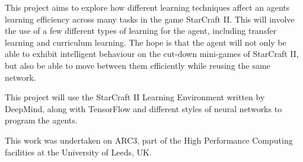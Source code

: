 This project aims to explore how different learning techniques affect an agents
learning efficiency across many tasks in the game StarCraft II\@.
This will involve the use of a few different types of learning for the agent,
including transfer learning and curriculum learning. The hope is that the
agent will not only be able to exhibit intelligent behaviour on the cut-down
mini-games of StarCraft II, but also be able to move between them efficiently
while reusing the same network.

This project will use the StarCraft II Learning Environment written by DeepMind,
along with TensorFlow and different styles of neural networks to program the agents.

This work was undertaken on ARC3, part of the High Performance Computing
facilities at the University of Leeds, UK\@.
